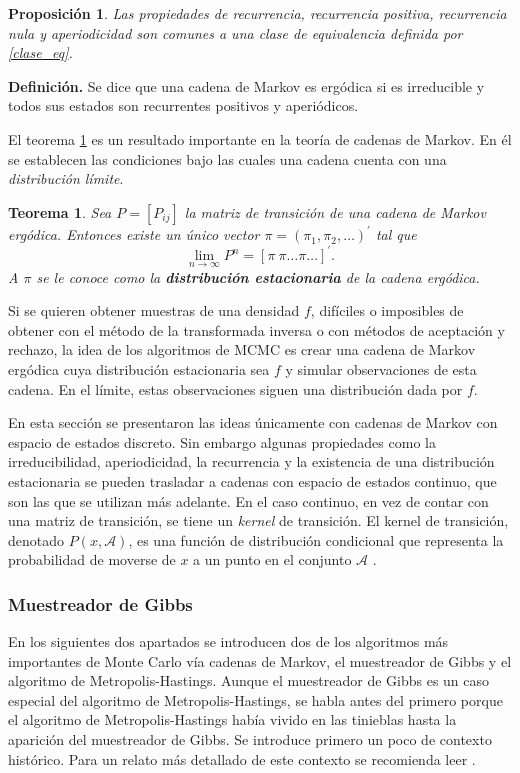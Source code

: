 \documentclass[11pt,a4paper]{article}
\newtheorem{theorem}{Teorema}[section]
\newtheorem{proposition}{Proposición}[subsection]
\begin{document}
\begin{proposition}
Las propiedades de recurrencia, recurrencia positiva, recurrencia nula y aperiodicidad son comunes a una clase de equivalencia definida por \eqref{clase_eq}.
\end{proposition}

\textbf{Definición.} Se dice que una cadena de Markov es ergódica si es irreducible y todos sus estados son recurrentes positivos y aperiódicos.

El teorema \ref{teo:ergodic} es un resultado importante en la teoría de cadenas de Markov. En él se establecen las condiciones bajo las cuales una cadena cuenta con una \textit{distribución límite}.

\begin{theorem}
\label{teo:ergodic}
Sea $P=[P_{ij}]$ la matriz de transición de una cadena de Markov ergódica. Entonces existe un único vector $\pi = (\pi_1, \pi_2, \dots)^\prime$ tal que
\begin{equation} \label{dist_limite}
\lim_{n \to \infty}P^n = [\pi \ \pi \dots \pi \dots ]^\prime.
\end{equation}
A $\pi$ se le conoce como la \textbf{distribución estacionaria} de la cadena ergódica.
\end{theorem}

Si se quieren obtener muestras de una densidad $f$, difíciles o imposibles de obtener con el método de la transformada inversa o con métodos de aceptación y rechazo, la idea de los algoritmos de MCMC es crear una cadena de Markov ergódica cuya distribución estacionaria sea $f$ y simular observaciones de esta cadena. En el límite, estas observaciones siguen una distribución dada por $f$.

En esta sección se presentaron las ideas únicamente con cadenas de Markov con espacio de estados discreto. Sin embargo algunas propiedades como la irreducibilidad, aperiodicidad, la recurrencia y la existencia de una distribución estacionaria se pueden trasladar a cadenas con espacio de estados continuo, que son las que se utilizan más adelante. En el caso continuo, en vez de contar con una matriz de transición, se tiene un \textit{kernel} de transición. El kernel de transición, denotado $P(x, \mathcal{A})$, es una función de distribución condicional que representa la probabilidad de moverse de $x$ a un punto en el conjunto $\mathcal{A}$ \citep{chib_mh}.

\subsubsection*{Muestreador de Gibbs}
En los siguientes dos apartados se introducen dos de los algoritmos más importantes de Monte Carlo vía cadenas de Markov, el muestreador de Gibbs y el algoritmo de Metropolis-Hastings. Aunque el muestreador de Gibbs es un caso especial del algoritmo de Metropolis-Hastings, se habla antes del primero porque el algoritmo de Metropolis-Hastings había vivido en las tinieblas hasta la aparición del muestreador de Gibbs. Se introduce primero un poco de contexto histórico. Para un relato más detallado de este contexto se recomienda leer \citet{bertsch}.
\end{document}

